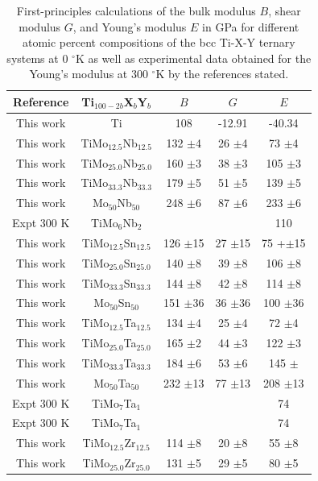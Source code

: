 \newpage
\begin{longtable}[H]{ c c c c c }
	\caption{First-principles calculations of the bulk modulus $B$, shear modulus $G$, and Young's modulus $E$ in GPa for different atomic percent compositions of the bcc Ti-X-Y ternary systems at 0 $^{\circ}$K as well as experimental data obtained for the Young's modulus at 300 $^{\circ}$K by the references stated.} 	\label{Ch6-table:tixyelasdata} \\
	\hline
	Reference & Ti$_{100-2b}$X$_b$Y$_b$ & $B$ &$G$ & $E$\\
	\hline
	\endhead
	\hline
	\endfoot
	This work & Ti & 108 & -12.91 & -40.34\\
	This work & TiMo$_{12.5}$Nb$_{12.5}$ & 132 $\pm$4 & 26 $\pm$4 & 73 $\pm$4\\
	This work & TiMo$_{25.0}$Nb$_{25.0}$ & 160 $\pm$3 & 38 $\pm$3 & 105 $\pm$3\\
	This work & TiMo$_{33.3}$Nb$_{33.3}$ & 179 $\pm$5 & 51 $\pm$5 & 139 $\pm$5\\
	This work & Mo$_{50}$Nb$_{50}$ & 248 $\pm$6 & 87 $\pm$6 & 233 $\pm$6\\
	Expt 300 K \cite{Niinomi2012} & TiMo$_{6}$Nb$_{2}$ & & & 110\\
	This work & TiMo$_{12.5}$Sn$_{12.5}$ & 126 $\pm$15 & 27 $\pm$15 & 75 +$\pm$15\\
	This work & TiMo$_{25.0}$Sn$_{25.0}$ & 140 $\pm$8 & 39 $\pm$8 & 106 $\pm$8\\
	This work & TiMo$_{33.3}$Sn$_{33.3}$ & 144 $\pm$8 & 42 $\pm$8 & 114 $\pm$8\\
	This work & Mo$_{50}$Sn$_{50}$ & 151 $\pm$36 & 36 $\pm$36 & 100 $\pm$36\\
	This work & TiMo$_{12.5}$Ta$_{12.5}$ & 134 $\pm$4 & 25 $\pm$4 & 72 $\pm$4\\
	This work & TiMo$_{25.0}$Ta$_{25.0}$ & 165 $\pm$2 & 44 $\pm$3 & 122 $\pm$3\\
	This work & TiMo$_{33.3}$Ta$_{33.3}$ & 184 $\pm$6 & 53 $\pm$6 & 145 $\pm$\\
	This work & Mo$_{50}$Ta$_{50}$ & 232 $\pm$13 & 77 $\pm$13 & 208 $\pm$13\\
	Expt 300 K \cite{Mohammed2014} & TiMo$_{7}$Ta$_{1}$ & & & 74\\
	Expt 300 K \cite{Niinomi2012}  & TiMo$_{7}$Ta$_{1}$ & & & 74\\
	This work & TiMo$_{12.5}$Zr$_{12.5}$ & 114 $\pm$8 & 20 $\pm$8 & 55 $\pm$8\\
	This work & TiMo$_{25.0}$Zr$_{25.0}$ & 131 $\pm$5 & 29 $\pm$5 & 80 $\pm$5\\

\end{longtable}
